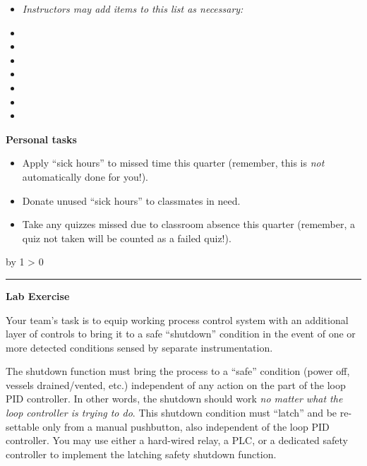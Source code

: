 \documentclass[12pt,a4paper]{book}
\def\oppgave{
            \advance\questnum by 1
            \ifnum \questnum > 0
                 \hrule
                 \vskip 3pt
                 \leftline{Oppgave \the\questnum}
                 \vskip 3pt \fi}
\begin{document}
\filbreak

\begin{itemize}
\item{} {\it Instructors may add items to this list as necessary:}
\vskip 10pt
\item{} \underbar{\hskip 50pt} 
\vskip 10pt
\item{} \underbar{\hskip 50pt} 
\vskip 10pt
\item{} \underbar{\hskip 50pt} 
\vskip 10pt
\item{} \underbar{\hskip 50pt} 
\vskip 10pt
\item{} \underbar{\hskip 50pt} 
\vskip 10pt
\item{} \underbar{\hskip 50pt} 
\vskip 10pt
\item{} \underbar{\hskip 50pt} 
\end{itemize}


\filbreak

\noindent
{\bf Personal tasks}

\begin{itemize}
\item{} Apply ``sick hours'' to missed time this quarter (remember, this is {\it not} automatically done for you!).
\item{} Donate unused ``sick hours'' to classmates in need.
\item{} Take any quizzes missed due to classroom absence this quarter (remember, a quiz not taken will be counted as a failed quiz!).
\end{itemize}

\vskip 10pt \filbreak 
\oppgave{} 

\noindent
{\bf Lab Exercise}

\vskip 5pt

Your team's task is to equip working process control system with an additional layer of controls to bring it to a safe ``shutdown'' condition in the event of one or more detected conditions sensed by separate instrumentation.

The shutdown function must bring the process to a ``safe'' condition (power off, vessels drained/vented, etc.) independent of any action on the part of the loop PID controller.  In other words, the shutdown should work {\it no matter what the loop controller is trying to do}.  This shutdown condition must ``latch'' and be re-settable only from a manual pushbutton, also independent of the loop PID controller.  You may use either a hard-wired relay, a PLC, or a dedicated safety controller to implement the latching safety shutdown function.
\end{document}
